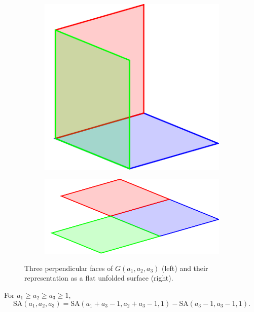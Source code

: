 \begin{figure}[]
\centering
\begin{subfigure}[b]{0.35\textwidth}
	\includegraphics[width=\textwidth]{figures/3/manifold_a.pdf}
	\label{fig:manifold_a}
\end{subfigure} \hfill%
\begin{subfigure}[b]{0.55\textwidth}
	\includegraphics[width=\textwidth]{figures/3/manifold_flat.pdf}
	\label{fig:manifold_b}
\end{subfigure}
\caption{Three perpendicular faces of $G(a_1,a_2,a_3)$ (left) and their representation as a flat unfolded surface (right).}
\label{fig:manifold_types}
\end{figure} 

\begin{lem}
\label{lem:unfolded_cube}
For $a_1 \geq a_2 \geq a_3 \geq 1$, 
$$\text{SA}(a_1, a_2, a_3) = \text{SA}(a_1+a_3-1, a_2+a_3-1, 1) - \text{SA}(a_3-1, a_3-1, 1).$$
\end{lem}

